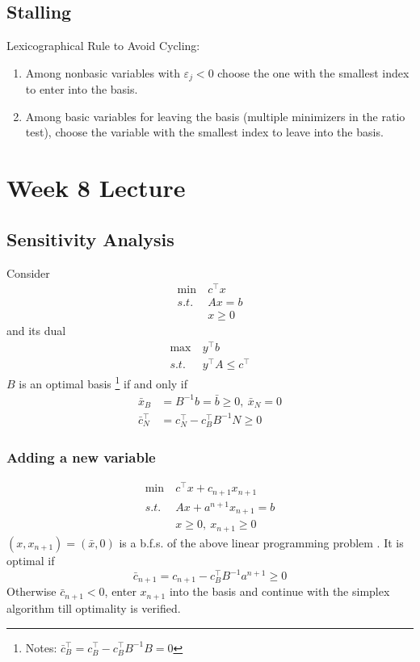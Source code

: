 \documentclass[11pt]{article}
\numberwithin{equation}{section}
\begin{document}
\subsection{Stalling}
Lexicographical Rule to Avoid Cycling:\begin{enumerate}
    \item Among nonbasic variables with $\varepsilon_j < 0$ choose the one with the smallest index to enter into the basis.
    \item Among basic variables for leaving the basis (multiple minimizers in the ratio test), choose the variable with the smallest index to leave into the basis. 
\end{enumerate}

\newpage
\section{Week 8 Lecture}
\subsection{Sensitivity Analysis}
Consider
\begin{align*}
    \min \  & {c}^{\top} {x} \\ s.t.\  & Ax=b \\ & x \geq 0
\end{align*}
and its dual
\begin{align*}
    \max \  & {y}^{\top} b \\ s.t.\  & y^\top A\leq c^\top
\end{align*}
 $B$ is an optimal basis \footnote{Notes: $\bar{c}_B^\top = c_B^\top  - c_B^\top B^{-1}B = 0$} if and only if 
\begin{align*}
    \bar{x}_{B} &= B^{-1} b=\bar{b} \geq 0, \  \bar{x}_N = 0 \\
    \bar{c}_{N}^\top &= {c}_{N}^\top - {c}_{B}^\top B^{-1} N \geq 0
\end{align*}

\subsubsection{Adding a new variable}
\begin{align*}
    \min \ & {c}^{\top} {x}+c_{n+1} x_{n+1} \\
    s.t. \ & Ax+a^{n+1} x_{n+1}=b \\
    & x \geq 0,\  x_{n+1} \geq 0
\end{align*}
$\left(x, x_{n+1}\right)=(\bar{x}, 0)$ is a b.f.s. of the above linear programming problem . It is optimal if 
$$\bar{c}_{n+1}=c_{n+1}-{c}_{B}^{\top} B^{-1} a^{n+1} \geq 0$$
Otherwise $\bar{c}_{n+1} < 0$, enter $x_{n+1}$ into the basis and continue with the simplex algorithm till optimality is verified.
\end{document}
